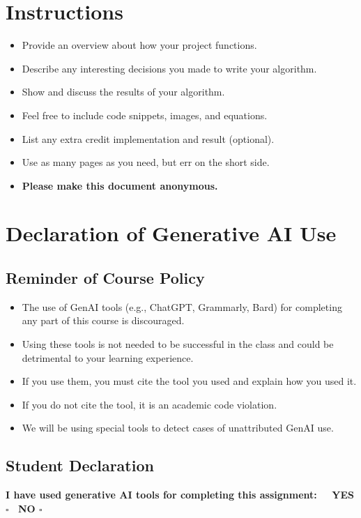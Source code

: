 \section*{Instructions}
\begin{itemize}
  \item Provide an overview about how your project functions. 
  \item Describe any interesting decisions you made to write your algorithm.
  \item Show and discuss the results of your algorithm.
  \item Feel free to include code snippets, images, and equations.
  \item List any extra credit implementation and result (optional).
  \item Use as many pages as you need, but err on the short side.
  \item \textbf{Please make this document anonymous.}
\end{itemize}

\section*{Declaration of Generative AI Use}
\subsection*{Reminder of Course Policy}
\begin{itemize}
    \item The use of GenAI tools (e.g., ChatGPT, Grammarly, Bard) for completing any part of this course is discouraged.
    \item Using these tools is not needed to be successful in the class and could be detrimental to your learning experience.
    \item If you use them, you must cite the tool you used and explain how you used it.
    \item If you do not cite the tool, it is an academic code violation.
    \item We will be using special tools to detect cases of unattributed GenAI use.
\end{itemize}

\subsection*{Student Declaration}

\textbf{I have used generative AI tools for completing this assignment: \ \ YES $\square$ \ NO $\square$}

